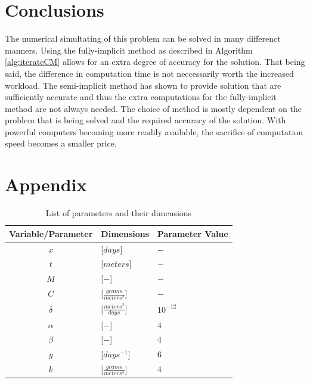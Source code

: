 \documentclass{article}
\theoremstyle{plain}
\begin{document}
\section{Conclusions}
  The numerical simultating of this problem can be solved in many differenct manners.
  Using the fully-implicit method as described in Algorithm \ref{alg:iterateCM} allows for an extra degree of accuracy for the solution.
  That being said, the difference in computation time is not neccessarily worth the increased workload.
  The semi-implicit method has shown to provide solution that are sufficiently accurate and thus the extra computations for the fully-implicit method are not always needed.
  The choice of method is mostly dependent on the problem that is being solved and the required accuracy of the solution.
  With powerful computers becoming more readily available, the sacrifice of computation speed becomes a smaller price.


\section*{Appendix}
  \begin{table}[h!bt]
    \centering
    \begin{tabular}{|c | l | l|}
      \hline 
      Variable/Parameter & Dimensions & Parameter Value\\
      \hline 
      $x$ & [$days$] & $-$ \\
      $t$ & [$meters$] & $-$ \\
      $ M  $ & [$-$] & $-$\\
      $ C  $ & [$\frac{grams}{meters^3}$]  & $-$\\
      $ {\delta} $ & [$\frac{meters^2}{days}$] & $10^{-12}$ \\
      $ \alpha $ & [$-$] & $4$\\
      $ \beta  $ & [$-$] & $4$\\
      $ {y}$ & [$days^{-1} $] & $6$ \\
      $ {k}  $ & [$\frac{grams}{meters^3}$] & $4$ \\
      \hline
    \end{tabular}
    \caption{List of parameters and their dimensions}
        \label{tab:varDimensions}
  \end{table}

\newpage



\end{document}
